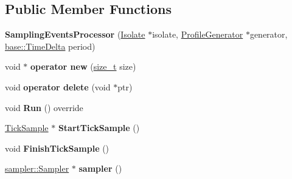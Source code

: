 \subsection*{Public Member Functions}
\begin{DoxyCompactItemize}
\item 
\mbox{\label{classv8_1_1internal_1_1SamplingEventsProcessor_a07c8dc87b6095e4cb0567ee9c6555454}} 
{\bfseries Sampling\+Events\+Processor} (\mbox{\hyperlink{classv8_1_1internal_1_1Isolate}{Isolate}} $\ast$isolate, \mbox{\hyperlink{classv8_1_1internal_1_1ProfileGenerator}{Profile\+Generator}} $\ast$generator, \mbox{\hyperlink{classv8_1_1base_1_1TimeDelta}{base\+::\+Time\+Delta}} period)
\item 
\mbox{\label{classv8_1_1internal_1_1SamplingEventsProcessor_aa1b0f1b7327c7f1595713c73aed710a7}} 
void $\ast$ {\bfseries operator new} (\mbox{\hyperlink{classsize__t}{size\+\_\+t}} size)
\item 
\mbox{\label{classv8_1_1internal_1_1SamplingEventsProcessor_a22fb8cd0eb638b41e15612e2ed3b05a2}} 
void {\bfseries operator delete} (void $\ast$ptr)
\item 
\mbox{\label{classv8_1_1internal_1_1SamplingEventsProcessor_a0839ee960e718cc160b42871fbfdb0f6}} 
void {\bfseries Run} () override
\item 
\mbox{\label{classv8_1_1internal_1_1SamplingEventsProcessor_a2e218538e88cc10453a07a76a1640ae4}} 
\mbox{\hyperlink{structv8_1_1internal_1_1TickSample}{Tick\+Sample}} $\ast$ {\bfseries Start\+Tick\+Sample} ()
\item 
\mbox{\label{classv8_1_1internal_1_1SamplingEventsProcessor_a016cbc0377e415f2d9d1af05d1d26320}} 
void {\bfseries Finish\+Tick\+Sample} ()
\item 
\mbox{\label{classv8_1_1internal_1_1SamplingEventsProcessor_ae3588523a326bb25e9b3ce17406ca94a}} 
\mbox{\hyperlink{classv8_1_1sampler_1_1Sampler}{sampler\+::\+Sampler}} $\ast$ {\bfseries sampler} ()
\end{DoxyCompactItemize}
